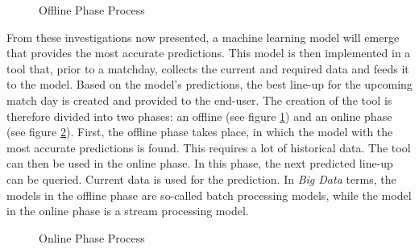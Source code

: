 \begin{figure}[H]
    \centering
    \captionsetup{justification=centering}
    \caption{Offline Phase Process}
    \label{fig:offline-phase}
\end{figure}

From these investigations now presented, a machine learning model will emerge that provides the most accurate predictions. This model is then implemented in a tool that, prior to a matchday, collects the current and required data and feeds it to the model. Based on the model's predictions, the best line-up for the upcoming match day is created and provided to the end-user. The creation of the tool is therefore divided into two phases: an offline (see figure \ref{fig:offline-phase}) and an online phase (see figure \ref{fig:online-phase}). First, the offline phase takes place, in which the model with the most accurate predictions is found. This requires a lot of historical data. The tool can then be used in the online phase. In this phase, the next predicted line-up can be queried. Current data is used for the prediction. In \emph{Big Data} terms, the models in the offline phase are so-called batch processing models, while the model in the online phase is a stream processing model.

\begin{figure}[H]
    \centering
    \captionsetup{justification=centering}
    \caption{Online Phase Process}
    \label{fig:online-phase}
\end{figure}

